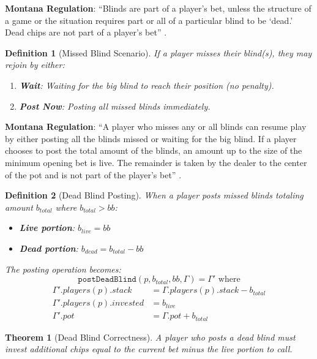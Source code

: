\documentclass[11pt,a4paper]{article}
\newtheorem{definition}{Definition}[section]
\newtheorem{theorem}{Theorem}[section]
\begin{document}
\textbf{Montana Regulation}: ``Blinds are part of a player's bet, unless the structure of a game or the situation requires part or all of a particular blind to be `dead.' Dead chips are not part of a player's bet'' \cite{montana2014poker}.

\begin{definition}[Missed Blind Scenario]
\label{def:missed-blind}
If a player misses their blind(s), they may rejoin by either:
\begin{enumerate}
    \item \textbf{Wait}: Waiting for the big blind to reach their position (no penalty).
    \item \textbf{Post Now}: Posting all missed blinds immediately.
\end{enumerate}
\end{definition}

\textbf{Montana Regulation}: ``A player who misses any or all blinds can resume play by either posting all the blinds missed or waiting for the big blind. If a player chooses to post the total amount of the blinds, an amount up to the size of the minimum opening bet is live. The remainder is taken by the dealer to the center of the pot and is not part of the player's bet'' \cite{montana2014poker}.

\begin{definition}[Dead Blind Posting]
\label{def:dead-blind-post}
When a player posts missed blinds totaling amount $b_{total}$ where $b_{total} > bb$:
\begin{itemize}
    \item \textbf{Live portion}: $b_{live} = bb$
    \item \textbf{Dead portion}: $b_{dead} = b_{total} - bb$
\end{itemize}

The posting operation becomes:
\[
\texttt{postDeadBlind}(p, b_{total}, bb, \Gamma) = \Gamma' \text{ where}
\]
\begin{align*}
\Gamma'.players(p).stack &= \Gamma.players(p).stack - b_{total} \\
\Gamma'.players(p).invested &= b_{live} \\
\Gamma'.pot &= \Gamma.pot + b_{total}
\end{align*}
\end{definition}

\begin{theorem}[Dead Blind Correctness]
\label{thm:dead-blind-correct}
A player who posts a dead blind must invest additional chips equal to the current bet minus the live portion to call.
\end{theorem}
\end{document}
